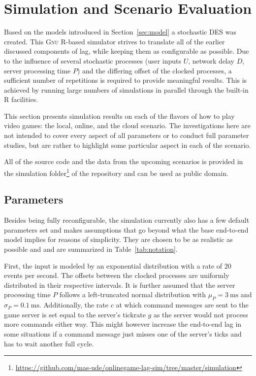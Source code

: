 \section{Simulation and Scenario Evaluation}
\label{sec:simulation}

Based on the models introduced in Section~\ref{sec:model} a stochastic \gls{DES} was created. This \textsc{Gnu R}-based simulator strives to translate all of the earlier discussed components of lag, while keeping them as configurable as possible.
Due to the influence of several stochastic processes (user inputs $U$, network delay $D$, server processing time $P$) and the differing offset of the clocked processes, a sufficient number of repetitions is required to provide meaningful results. This is achieved by running large numbers of simulations in parallel through the built-in R facilities.

This section presents simulation results on each of the flavors of how to play video games: the local, online, and the cloud scenario. The investigations here are not intended to cover every aspect of all parameters or to conduct full parameter studies, but are rather to highlight some particular aspect in each of the scenario.

All of the source code and the data from the upcoming scenarios is provided in the simulation folder\footnote{\url{https://github.com/mas-ude/onlinegame-lag-sim/tree/master/simulation}} of the repository and can be used as public domain.


\subsection{Parameters}

Besides being fully reconfigurable, the simulation currently also has a few default parameters set and makes assumptions that go beyond what the base end-to-end model implies for reasons of simplicity. They are chosen to be as realistic as possible and and are summarized in Table~\ref{tab:notation}.

First, the input is modeled by an exponential distribution with a rate of $20$ events per second. The offsets between the clocked processes are uniformly distributed in their respective intervals. It is further assumed that the server processing time $P$ follows a left-truncated normal distribution with $\mu_P = \SI{3}{\milli\second}$ and $\sigma_P = \SI{0.1}{\milli\second}$.
Additionally, the rate $c$ at which command messages are sent to the game server is set equal to the server's tickrate $g$ as the server would not process more commands either way. This might however increase the end-to-end lag in some situations if a command message just misses one of the server's ticks and has to wait another full cycle.


